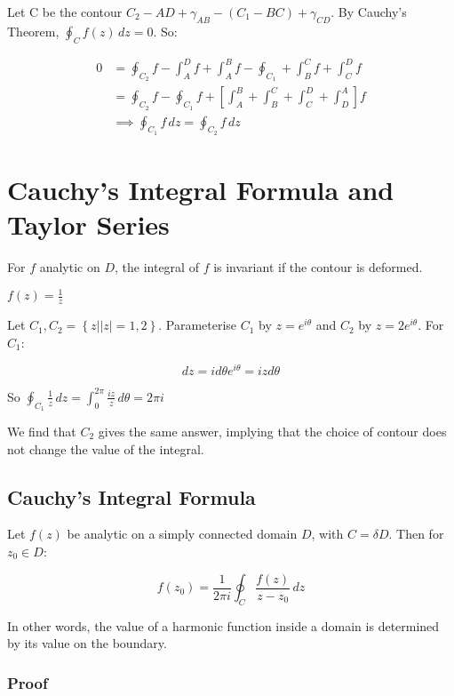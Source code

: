 \documentclass{physics_notes}
\begin{document}
Let C be the contour $C_2 - AD + \gamma_{AB} - (C_1 - BC) + \gamma_{CD}$. By Cauchy's Theorem, $\oint_C f(z) \, dz = 0$. So:

\begin{align*}
0 &= \oint_{C_2} f - \int_A^D f + \int_A^B f - \oint_{C_1} + \int_B^C f + \int_C^D f \\
&= \oint_{C_2} f - \oint_{C_1} f + \left[ \int_A^B + \int_B^C + \int_C^D + \int_D^A \right] f \\
&\implies \oint_{C_1} f\,dz = \oint_{C_2} f\,dz
\end{align*}

\section{Cauchy's Integral Formula and Taylor Series}

For $f$ analytic on $D$, the integral of $f$ is invariant if the contour is deformed. 

\begin{example}{$f(z) = \frac{1}{z}$}

Let $C_1, C_2 = \left\{ z \rvert |z| = 1,2\right\}$. Parameterise $C_1$ by $z = e^{i\theta}$ and $C_2$ by $z = 2e^{i\theta}$. For $C_1$:

\[ dz = id\theta e^{i\theta} = izd\theta \]

So $\oint_{C_1} \frac{1}{z} \, dz = \int_0^{2\pi} \frac{iz}{z} \, d\theta = 2\pi i$

\end{example}

We find that $C_2$ gives the same answer, implying that the choice of contour does not change the value of the integral. 

\subsection{Cauchy's Integral Formula }

Let $f(z)$ be analytic on a simply connected domain $D$, with $C = \delta D$. Then for $z_0 \in D$:

\[ f(z_0) = \frac{1}{2\pi i} \oint_C \frac{f(z)}{z - z_0} \, dz \]

In other words, the value of a harmonic function inside a domain is determined by its value on the boundary. 

\subsubsection*{Proof}
\end{document}
